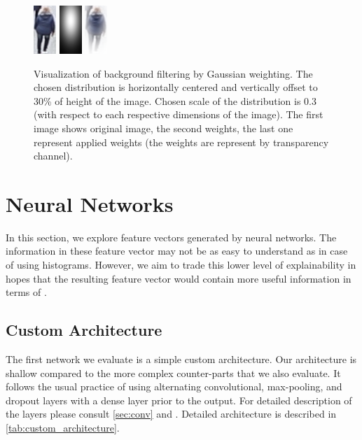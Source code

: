 \begin{figure}
    \centering
    \includegraphics{img/background_filter/1_original.png} \hspace{1cm} \includegraphics{img/background_filter/weights.png} \hspace{1cm}
    \includegraphics{img/background_filter/weights_applied.png}
    \caption[Visualization of background filtering by Gaussian weighting]{Visualization of background filtering by Gaussian weighting. The chosen distribution is horizontally centered and vertically offset to 30\% of height of the image. Chosen scale of the distribution is 0.3 (with respect to each respective dimensions of the image). The first image shows original image, the second weights, the last one represent applied weights (the weights are represent by transparency channel).}
    \label{fig:gaussian_weighting}
\end{figure}


\section{Neural Networks}



In this section, we explore feature vectors generated by neural networks. The information in these feature vector may not be as easy to understand as in case of using histograms. However, we aim to trade this lower level of explainability in hopes that the resulting feature vector would contain more useful information in terms of \reid{}.


\subsection{Custom Architecture}

The first network we evaluate is a simple custom architecture. Our architecture is shallow compared to the more complex counter-parts that we also evaluate. It follows the usual practice of using alternating convolutional, max-pooling, and dropout layers with a dense layer prior to the output. For detailed description of the layers please consult \autoref{sec:conv} and \cite{deeplearningbook}. Detailed architecture is described in \autoref{tab:custom_architecture}.

